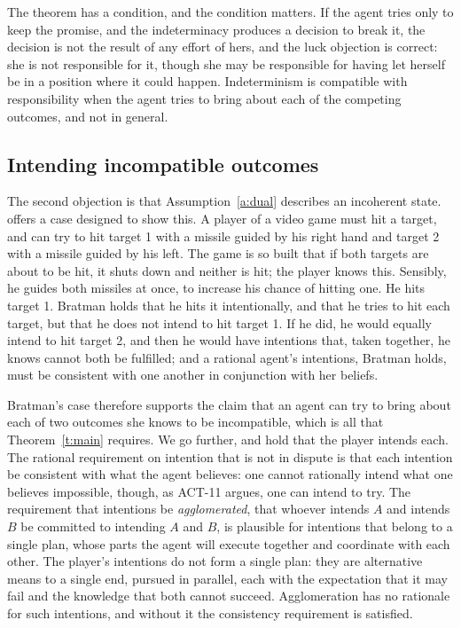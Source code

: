 \documentclass{situationist-preprint}
\begin{document}
The theorem has a condition, and the condition matters. If the agent tries only to keep the promise, and the indeterminacy produces a decision to break it, the decision is not the result of any effort of hers, and the luck objection is correct: she is not responsible for it, though she may be responsible for having let herself be in a position where it could happen. Indeterminism is compatible with responsibility when the agent tries to bring about each of the competing outcomes, and not in general.

\subsection{Intending incompatible outcomes}

The second objection is that Assumption~\ref{a:dual} describes an incoherent state. \citet{Bratman1984,Bratman1987} offers a case designed to show this. A player of a video game must hit a target, and can try to hit target 1 with a missile guided by his right hand and target 2 with a missile guided by his left. The game is so built that if both targets are about to be hit, it shuts down and neither is hit; the player knows this. Sensibly, he guides both missiles at once, to increase his chance of hitting one. He hits target 1. Bratman holds that he hits it intentionally, and that he tries to hit each target, but that he does not intend to hit target 1. If he did, he would equally intend to hit target 2, and then he would have intentions that, taken together, he knows cannot both be fulfilled; and a rational agent's intentions, Bratman holds, must be consistent with one another in conjunction with her beliefs.

Bratman's case therefore supports the claim that an agent can try to bring about each of two outcomes she knows to be incompatible, which is all that Theorem~\ref{t:main} requires. We go further, and hold that the player intends each. The rational requirement on intention that is not in dispute is that each intention be consistent with what the agent believes: one cannot rationally intend what one believes impossible, though, as ACT-11 argues, one can intend to try. The requirement that intentions be \emph{agglomerated}, that whoever intends $A$ and intends $B$ be committed to intending $A$ and $B$, is plausible for intentions that belong to a single plan, whose parts the agent will execute together and coordinate with each other. The player's intentions do not form a single plan: they are alternative means to a single end, pursued in parallel, each with the expectation that it may fail and the knowledge that both cannot succeed. Agglomeration has no rationale for such intentions, and without it the consistency requirement is satisfied.
\end{document}
